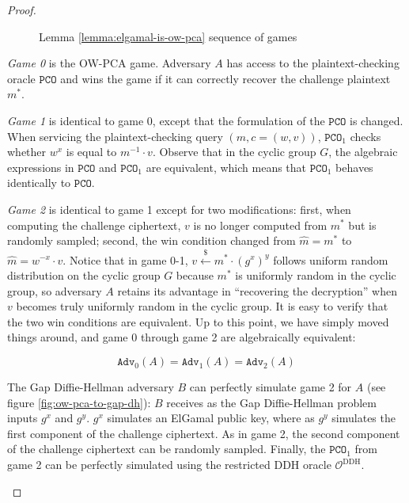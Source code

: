 \documentclass[journal=tches,submission]{iacrtrans}
\newcommand{\pco}{\texttt{PCO}}
\newcommand{\leftsample}{\stackrel{\$}{\leftarrow}}
\newcommand{\adv}{\texttt{Adv}}
\begin{document}
\begin{proof}
\begin{figure}
        \caption{Lemma \ref{lemma:elgamal-is-ow-pca} sequence of games}\label{fig:elgamal-pca-games}
    \end{figure}

    \emph{Game 0} is the OW-PCA game. Adversary $A$ has access to the plaintext-checking oracle $\pco$ and wins the game if it can correctly recover the challenge plaintext $m^\ast$.

    \emph{Game 1} is identical to game 0, except that the formulation of the $\pco$ is changed. When servicing the plaintext-checking query $(m, c = (w, v))$, $\pco_1$ checks whether $w^x$ is equal to $m^{-1} \cdot v$. Observe that in the cyclic group $G$, the algebraic expressions in $\pco$ and $\pco_1$ are equivalent, which means that $\pco_1$ behaves identically to $\pco$.

    \emph{Game 2} is identical to game 1 except for two modifications: first, when computing the challenge ciphertext, $v$ is no longer computed from $m^\ast$ but is randomly sampled; second, the win condition changed from $\hat{m} = m^\ast$ to $\hat{m} = w^{-x}\cdot v$. Notice that in game 0-1, $v \leftsample m^\ast \cdot (g^x)^y$ follows uniform random distribution on the cyclic group $G$ because $m^\ast$ is uniformly random in the cyclic group, so adversary $A$ retains its advantage in ``recovering the decryption'' when $v$ becomes truly uniformly random in the cyclic group. It is easy to verify that the two win conditions are equivalent. Up to this point, we have simply moved things around, and game 0 through game 2 are algebraically equivalent:

    \begin{equation*}
        \adv_0(A) = \adv_1(A) = \adv_2(A)
    \end{equation*}

    The Gap Diffie-Hellman adversary $B$ can perfectly simulate game 2 for $A$ (see figure \ref{fig:ow-pca-to-gap-dh}): $B$ receives as the Gap Diffie-Hellman problem inputs $g^x$ and $g^y$. $g^x$ simulates an ElGamal public key, where as $g^y$ simulates the first component of the challenge ciphertext. As in game 2, the second component of the challenge ciphertext can be randomly sampled. Finally, the $\pco_1$ from game 2 can be perfectly simulated using the restricted DDH oracle $\mathcal{O}^\text{DDH}$.

    \begin{figure}
        \centering


\end{figure}
\end{proof}
\end{document}
